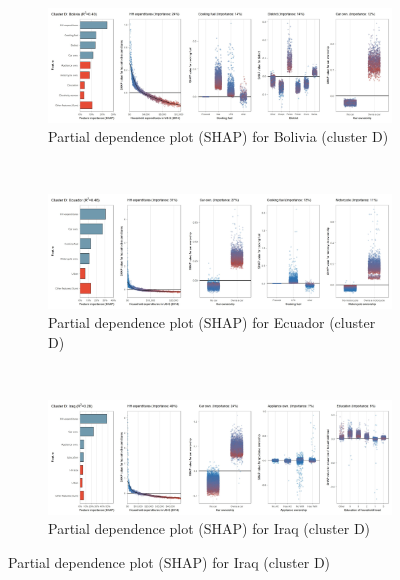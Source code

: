 \begin{figure}[ht!]\ContinuedFloat
    \centering
   \begin{subfigure}[b]{\textwidth}
   \centering
         \caption{Partial dependence plot (SHAP) for Bolivia (cluster D)}
         \label{fig:5b_BOL}
         \includegraphics[width=\textwidth]{Figure 5b/Figure_5b_BOL}
         \end{subfigure}
    \\
    \vspace{0.5cm}
   \begin{subfigure}[b]{\textwidth}        
    \centering
         \caption{Partial dependence plot (SHAP) for Ecuador (cluster D)}
         \label{fig:5b_ECU}
         \includegraphics[width=\textwidth]{Figure 5b/Figure_5b_ECU}
    \end{subfigure}
    \\
    \vspace{0.5cm}
   \begin{subfigure}[b]{\textwidth}
    \centering
         \caption{Partial dependence plot (SHAP) for Iraq (cluster D)}
         \label{fig:5b_IRQ}
         \includegraphics[width=\textwidth]{Figure 5b/Figure_5b_IRQ}
         \end{subfigure}

\end{figure}
